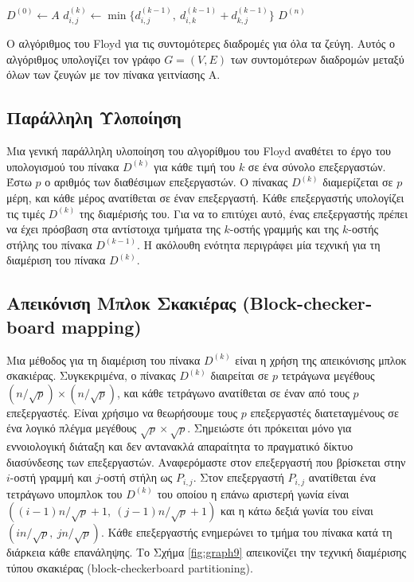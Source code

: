 \documentclass[12pt,a4paper]{article}
\begin{document}
\begin{algorithm}[H]
\begin{algorithmic}[1]
    \State $D^{(0)} \gets A$
                \State $d_{i,j}^{(k)} \gets \min\{d_{i,j}^{(k-1)},\ d_{i,k}^{(k-1)} + d_{k,j}^{(k-1)}\}$
            \EndFor
        \EndFor
    \EndFor
    \State \Return $D^{(n)}$
\EndProcedure
\end{algorithmic}
\end{algorithm}

{\raggedright{} Ο αλγόριθμος του \foreignlanguage{english}{Floyd} για τις συντομότερες διαδρομές για όλα τα ζεύγη. Αυτός ο αλγόριθμος υπολογίζει τον γράφο $G=(V,E)$ των συντομότερων διαδρομών μεταξύ όλων των ζευγών με τον πίνακα γειτνίασης Α. \label{alg:floyd}\par}
\vspace{0.3cm}

\subsection*{Παράλληλη Υλοποίηση}
Μια γενική παράλληλη υλοποίηση του αλγορίθμου του \foreignlanguage{english}{Floyd} αναθέτει το έργο του υπολογισμού του πίνακα $D^{(k)}$ για κάθε τιμή του $k$ σε ένα σύνολο επεξεργαστών. Έστω $p$ ο αριθμός των διαθέσιμων επεξεργαστών. Ο πίνακας $D^{(k)}$ διαμερίζεται σε $p$ μέρη, και κάθε μέρος ανατίθεται σε έναν επεξεργαστή.
Κάθε επεξεργαστής υπολογίζει τις τιμές $D^{(k)}$ της διαμέρισής του. Για να το επιτύχει αυτό, ένας επεξεργαστής πρέπει να έχει πρόσβαση στα αντίστοιχα τμήματα της $k$-οστής γραμμής και της $k$-οστής στήλης του πίνακα $D^{(k-1)}$. Η ακόλουθη ενότητα περιγράφει μία τεχνική για τη διαμέριση του πίνακα $D^{(k)}$.

\subsection*{Απεικόνιση Μπλοκ Σκακιέρας (\foreignlanguage{english}{Block-checkerboard mapping})}
Μια μέθοδος για τη διαμέριση του πίνακα $D^{(k)}$ είναι η χρήση της απεικόνισης μπλοκ σκακιέρας. Συγκεκριμένα, ο πίνακας $D^{(k)}$ διαιρείται σε $p$ τετράγωνα μεγέθους $(n/\sqrt{p})\times(n/\sqrt{p})$, και κάθε τετράγωνο ανατίθεται σε έναν από τους $p$ επεξεργαστές. Είναι χρήσιμο να θεωρήσουμε τους $p$ επεξεργαστές διατεταγμένους σε ένα λογικό πλέγμα μεγέθους $\sqrt{p}\times\sqrt{p}$. Σημειώστε ότι πρόκειται μόνο για εννοιολογική διάταξη και δεν αντανακλά απαραίτητα το πραγματικό δίκτυο διασύνδεσης των επεξεργαστών. Αναφερόμαστε στον επεξεργαστή που βρίσκεται στην $i$-οστή γραμμή και $j$-οστή στήλη ως $P_{i,j}$. Στον επεξεργαστή $P_{i,j}$ ανατίθεται ένα τετράγωνο υπομπλοκ του $D^{(k)}$ του οποίου η επάνω αριστερή γωνία είναι
\mbox{$((i - 1)n/\sqrt{p} + 1,\ (j - 1)n/\sqrt{p} + 1)$}
και η κάτω δεξιά γωνία του είναι $(in/{\sqrt{p}},\ jn/{\sqrt{p}})$.
Κάθε επεξεργαστής ενημερώνει το τμήμα του πίνακα κατά τη διάρκεια κάθε επανάληψης. 
Το Σχήμα \ref{fig:graph9} απεικονίζει την τεχνική διαμέρισης τύπου σκακιέρας (\foreignlanguage{english}{block-checkerboard partitioning}).
\end{document}
